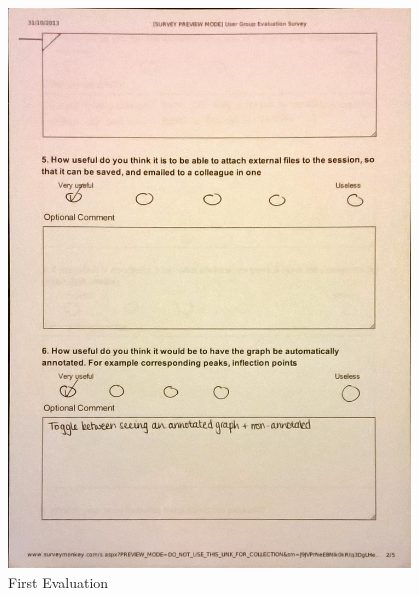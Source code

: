 \begin{figure}[h!]
    \centering
    \includegraphics[width=0.95\textwidth]{images/user_eval/user_eval_2.jpg}
    \caption{First Evaluation}
\end{figure}

